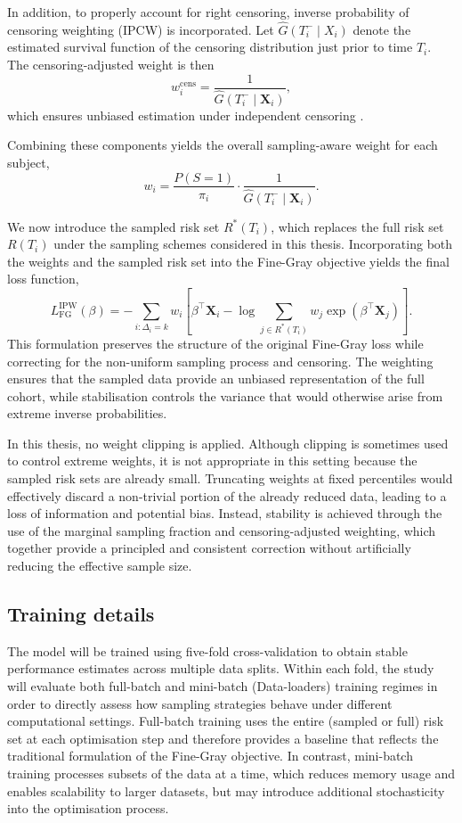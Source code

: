 \documentclass[a4paper,twoside,12pt]{report}
\begin{document}
In addition, to properly account for right censoring, inverse probability of censoring weighting (IPCW) is incorporated. Let $\hat{G}(T_i^- \mid X_i)$ denote the estimated survival function of the censoring distribution just prior to time $T_i$. The censoring-adjusted weight is then
\[
w_i^{\mathrm{cens}} = \frac{1}{\hat{G}(T_i^- \mid \boldsymbol{X}_i)},
\]
which ensures unbiased estimation under independent censoring \cite{Graf1999}.

Combining these components yields the overall sampling-aware weight for each subject,
\[
w_i = \frac{P(S=1)}{\pi_i} \cdot \frac{1}{\hat{G}(T_i^- \mid \boldsymbol{X}_i)}.
\]

We now introduce the sampled risk set $R^*(T_i)$, which replaces the full risk set $R(T_i)$ under the sampling schemes considered in this thesis. Incorporating both the weights and the sampled risk set into the Fine-Gray objective yields the final loss function,
\[
L_{\mathrm{FG}}^{\mathrm{IPW}}(\beta)
=
-\sum_{i:\Delta_i = k}
w_i
\left[
\beta^\top \boldsymbol{X}_i
-
\log \sum_{j \in R^*(T_i)}
w_j \exp(\beta^\top \boldsymbol{X}_j)
\right].
\]
This formulation preserves the structure of the original Fine-Gray loss while correcting for the non-uniform sampling process and censoring. The weighting ensures that the sampled data provide an unbiased representation of the full cohort, while stabilisation controls the variance that would otherwise arise from extreme inverse probabilities.

In this thesis, no weight clipping is applied. Although clipping is sometimes used to control extreme weights, it is not appropriate in this setting because the sampled risk sets are already small. Truncating weights at fixed percentiles would effectively discard a non-trivial portion of the already reduced data, leading to a loss of information and potential bias. Instead, stability is achieved through the use of the marginal sampling fraction and censoring-adjusted weighting, which together provide a principled and consistent correction without artificially reducing the effective sample size.

\subsection{Training details}

The model will be trained using five-fold cross-validation to obtain stable performance estimates across multiple data splits. Within each fold, the study will evaluate both full-batch and mini-batch (Data-loaders) training regimes in order to directly assess how sampling strategies behave under different computational settings. Full-batch training uses the entire (sampled or full) risk set at each optimisation step and therefore provides a baseline that reflects the traditional formulation of the Fine-Gray objective. In contrast, mini-batch training processes subsets of the data at a time, which reduces memory usage and enables scalability to larger datasets, but may introduce additional stochasticity into the optimisation process.
\end{document}
